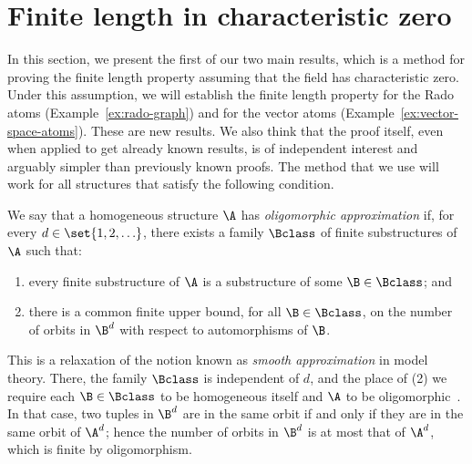 \section{Finite length in characteristic zero}
\label{sec:characteristic-zero}

In this section, we present the first of our two main results, which is a  method for proving the finite length property assuming that the field has characteristic zero. Under this assumption, we will establish the finite length property for the Rado atoms (Example~\ref{ex:rado-graph}) and for the vector atoms (Example~\ref{ex:vector-space-atoms}). These are new results. We also think that the proof itself, even when applied to get already known results, is of independent interest and arguably simpler than previously known proofs.
The method that we use will work for all structures that satisfy the following condition. 
 
\begin{definition}
    \label{def:oligomorphic-approximation} We say that a homogeneous structure $\A$ has \emph{oligomorphic approximation} if, for every $d \in \set{1,2,\ldots}$, there exists a family $\Bclass$ of finite substructures of $\A$ such that: 
    \begin{enumerate}
        \item \label{item:oligomorphic-approximation-embedding} every finite substructure of $\A$ is a substructure of some $\B \in \Bclass$; and
        \item \label{item:oligomorphic-approximation-orbits} there is a common finite upper bound, for all $\B \in \Bclass$, on the number of orbits in $\B^d$ with respect to automorphisms of $\B$.
    \end{enumerate}
\end{definition}

\color{magenta}
This is a relaxation of the notion known as \emph{smooth approximation} in model theory. There, the family $\Bclass$ is independent of $d$,
and the place of (2) we require each $\B \in \Bclass$ to be homogeneous itself and $\A$ to be oligomorphic~\cite[p.~440]{KLM89}. 
In that case, two tuples in $\B^d$ are in the same orbit if and only if they are in the same orbit of $\A^d$; 
hence the number of orbits in $\B^d$ is at most that of $\A^d$, which is finite by oligomorphism.
\color{black}

